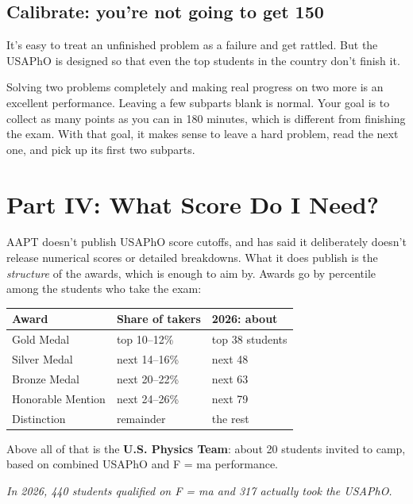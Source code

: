 \documentclass[11pt]{article}
\begin{document}
\subsection*{Calibrate: you're not going to get 150}

It's easy to treat an unfinished problem as a failure and get rattled. But the USAPhO is
designed so that even the top students in the country don't finish it.

\begin{keybox}
Solving two problems completely and making real progress on two more is an excellent
performance. Leaving a few subparts blank is normal. Your goal is to collect as many points
as you can in 180 minutes, which is different from finishing the exam. With that goal, it
makes sense to leave a hard problem, read the next one, and pick up its first two subparts.
\end{keybox}

\section{Part IV: What Score Do I Need?}

AAPT doesn't publish USAPhO score cutoffs, and has said it deliberately doesn't release
numerical scores or detailed breakdowns. What it does publish is the \emph{structure} of the
awards, which is enough to aim by. Awards go by percentile among the students who take the
exam:

\begin{center}
\begin{tabular}{lll}
\hline
\textbf{Award} & \textbf{Share of takers} & \textbf{2026: about} \\
\hline
Gold Medal                & top 10--12\%    & top 38 students \\
Silver Medal              & next 14--16\%   & next 48 \\
Bronze Medal              & next 20--22\%   & next 63 \\
Honorable Mention         & next 24--26\%   & next 79 \\
Distinction               & remainder       & the rest \\
\hline
\end{tabular}
\end{center}

Above all of that is the \textbf{U.S. Physics Team}: about 20 students invited to camp,
based on combined USAPhO and F = ma performance.

\emph{In 2026, 440 students qualified on F = ma and 317 actually took the USAPhO.}
\end{document}
